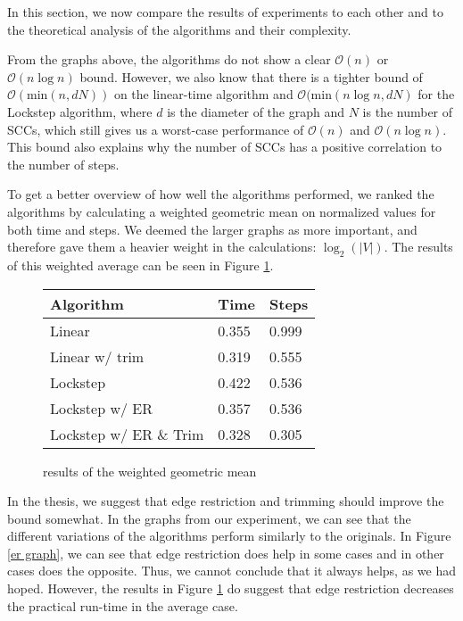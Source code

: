 \documentclass[../master/master.tex]{subfiles}
\begin{document}
In this section, we now compare the results of experiments to each other and to the theoretical analysis of the algorithms and their complexity.

From the graphs above, the algorithms do not show a clear $\mathcal{O}(n)$ or $\mathcal{O}(n\log n)$ bound. However, we also know that there is a tighter bound of $\mathcal{O}(\text{min}(n, dN))$ on the linear-time algorithm and $\mathcal{O}(\text{min}(n\log n, dN)$ for the Lockstep algorithm, where $d$ is the diameter of the graph and $N$ is the number of SCCs, which still gives us a worst-case performance of $\mathcal{O}(n)$ and $\mathcal{O}(n\log n)$. This bound also explains why the number of SCCs has a positive correlation to the number of steps.

To get a better overview of how well the algorithms performed, we ranked the algorithms by calculating a weighted geometric mean on normalized values for both time and steps. We deemed the larger graphs as more important, and therefore gave them a heavier weight in the calculations: $\log_2(|V|)$. The results of this weighted average can be seen in Figure \ref{mean}.

\begin{figure}[h]
  \centering
  \begin{tabular}{|l|l|l|}
    \hline
    Algorithm              & Time   & Steps  \\
    \hline
    Linear                 & 0.355 & 0.999 \\
    \hline
    Linear w/ trim         & 0.319 & 0.555 \\
    \hline
    Lockstep               & 0.422 & 0.536 \\
    \hline
    Lockstep w/ ER         & 0.357 & 0.536 \\
    \hline
    Lockstep w/ ER \& Trim & 0.328 & 0.305 \\
    \hline
\end{tabular}
\caption{results of the weighted geometric mean}\label{mean}
\end{figure}

In the thesis, we suggest that edge restriction and trimming should improve the bound somewhat. In the graphs from our experiment, we can see that the different variations of the algorithms perform similarly to the originals. In Figure \ref{er graph}, we can see that edge restriction does help in some cases and in other cases does the opposite. Thus, we cannot conclude that it always helps, as we had hoped. However, the results in Figure \ref{mean} do suggest that edge restriction decreases the practical run-time in the average case. 
\end{document}
